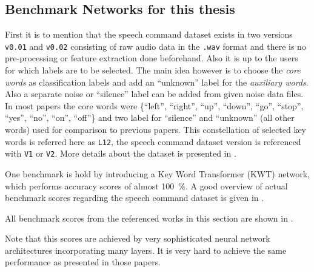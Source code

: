\subsection{Benchmark Networks for this thesis}\label{sec:prev_kws_benchmark}
First it is to mention that the speech command dataset \cite{Warden2018} exists in two versions \texttt{v0.01} and \texttt{v0.02} consisting of raw audio data in the \texttt{.wav} format and there is no pre-processing or feature extraction done beforehand.
Also it is up to the users for which labels are to be selected.
The main idea however is to choose the \emph{core words} as classification labels and add an \enquote{unknown} label for the \emph{auxiliary words}.
Also a separate noise or \enquote{silence} label can be added from given noise data files.
In most papers the core words were \{\enquote{left},  \enquote{right}, \enquote{up}, \enquote{down}, \enquote{go}, \enquote{stop}, \enquote{yes}, \enquote{no}, \enquote{on}, \enquote{off}\} and two label for \enquote{silence} and \enquote{unknown} (all other words) used for comparison to previous papers.
This constellation of selected key words is referred here as \texttt{L12}, the speech command dataset version is referenced with \texttt{V1} or \texttt{V2}.
More details about the dataset is presented in .

One benchmark is hold by \cite{Berg2021} introducing a Key Word Transformer (KWT) network, which performs accuracy scores of almost \SI{100}{\percent}.
A good overview of actual benchmark scores regarding the speech command dataset is given in \cite{PaperswithcodeKWS}.

All benchmark scores from the referenced works in this section are shown in .

Note that this scores are achieved by very sophisticated neural network architectures incorporating many layers.
It is very hard to achieve the same performance as presented in those papers.
